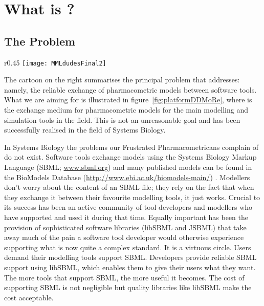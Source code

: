 \newcommand{\matlab}{MATLAB\textsuperscript{\textregistered}}
\chapter{What is \pharmml?}
\label{chap:pharmml-what}

\section{The Problem}

\begin{wrapfigure}{r}{0.45\linewidth}
  \texttt{[image: MMLdudesFinal2]}
\end{wrapfigure}


The cartoon on the right summarises the principal problem that \pharmml addresses: namely,
the reliable exchange of pharmacometric models between software tools. What we are aiming
for is illustrated in figure~\ref{fig:platformDDMoRe}, where \pharmml is the exchange medium
for pharmacometric models for the main modelling and simulation tools in the field. This is
not an unreasonable goal and has been successfully realised in the field of Systems Biology.

In Systems Biology the problems our Frustrated Pharmacometricans complain of do not exist. Software
tools exchange models using the Systems Biology Markup Language (SBML; \url{www.sbml.org})
\cite{SBML} and many published models can be found in the BioModels Database
(\url{http://www.ebi.ac.uk/biomodels-main/}) \cite{BioModels2010}. Modellers don't worry about the
content of an SBML file; they rely on the fact that when they exchange it between their favourite
modelling tools, it just works. Crucial to its success has been an active community of tool
developers and modellers who have supported and used it during
that time. Equally important has been the provision of sophisticated software libraries (libSBML
and JSBML) that take away much of the pain a software tool developer would otherwise experience
supporting what is now quite a complex standard. It is a virtuous circle. Users demand their
modelling tools support SBML\@. Developers provide reliable SBML support using libSBML, which
enables them to give their users what they want. The more tools that support SBML, the more useful
it becomes. The cost of supporting SBML is not negligible but quality libraries like libSBML make
the cost acceptable.

